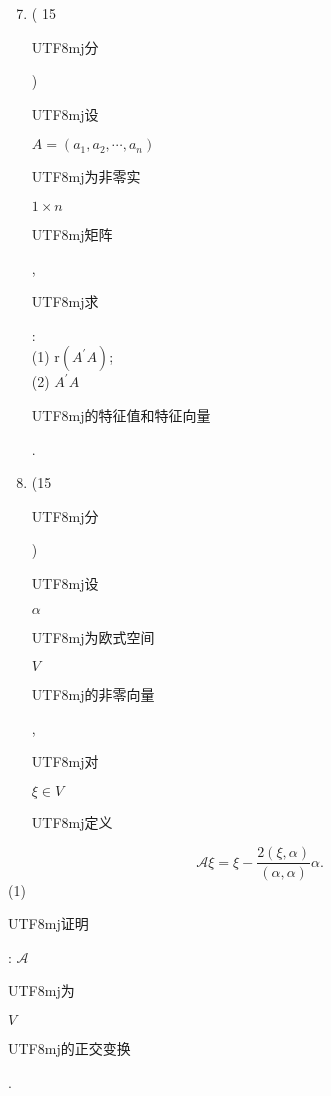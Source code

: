 \documentclass[10pt]{article}
\begin{document}
\begin{enumerate}
  \setcounter{enumi}{6}
  \item ( 15 \begin{CJK}{UTF8}{mj}分\end{CJK}) \begin{CJK}{UTF8}{mj}设\end{CJK} $A=\left(a_{1}, a_{2}, \cdots, a_{n}\right)$ \begin{CJK}{UTF8}{mj}为非零实\end{CJK} $1 \times n$ \begin{CJK}{UTF8}{mj}矩阵\end{CJK}, \begin{CJK}{UTF8}{mj}求\end{CJK}:\\
(1) $\mathrm{r}\left(A^{\prime} A\right)$;\\
(2) $A^{\prime} A$ \begin{CJK}{UTF8}{mj}的特征值和特征向量\end{CJK}.

  \item (15 \begin{CJK}{UTF8}{mj}分\end{CJK}) \begin{CJK}{UTF8}{mj}设\end{CJK} $\alpha$ \begin{CJK}{UTF8}{mj}为欧式空间\end{CJK} $V$ \begin{CJK}{UTF8}{mj}的非零向量\end{CJK}, \begin{CJK}{UTF8}{mj}对\end{CJK} $\xi \in V$ \begin{CJK}{UTF8}{mj}定义\end{CJK}

\end{enumerate}
$$
\mathscr{A} \xi=\xi-\frac{2(\xi, \alpha)}{(\alpha, \alpha)} \alpha .
$$
(1) \begin{CJK}{UTF8}{mj}证明\end{CJK}: $\mathscr{A}$ \begin{CJK}{UTF8}{mj}为\end{CJK} $V$ \begin{CJK}{UTF8}{mj}的正交变换\end{CJK}.
\end{document}
